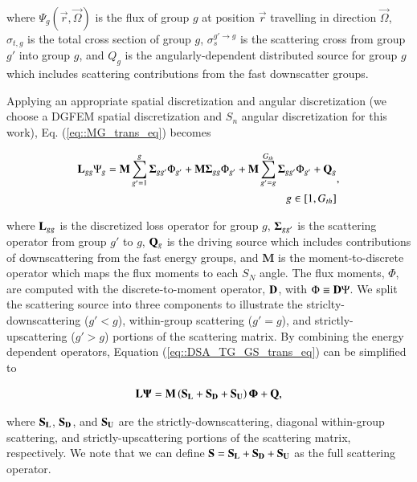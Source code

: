 \documentclass[preprint,10pt]{elsarticle}
\begin{document}
\noindent where $\Psi_g (\vec{r}, \vec{\Omega})$ is the flux of group $g$ at position $\vec{r}$ travelling in direction $\vec{\Omega}$, $\sigma_{t,g}$ is the total cross section of group $g$, $ \sigma_{s}^{g' \rightarrow g}$ is the scattering cross from group $g'$ into group $g$, and $Q_g$ is the angularly-dependent distributed source for group $g$ which includes scattering contributions from the fast downscatter groups.

Applying an appropriate spatial discretization and angular discretization (we choose a DGFEM spatial discretization and $S_n$ angular discretization for this work), Eq. (\ref{eq::MG_trans_eq}) becomes

\begin{equation}
\label{eq::DSA_TG_GS_trans_eq}
\begin{aligned}
{\bf L}_{gg} \Psi_g ={\bf M} \sum_{g'=1}^{g} {\bf \Sigma}_{g g'} \Phi_{g'} + {\bf M} {\bf \Sigma}_{g g} \Phi_{g'} + {\bf M} \sum_{g'=g}^{G_{th}} {\bf \Sigma}_{g g'} \Phi_{g'}+ {\bf Q}_g  \\
g \in [1,G_{th}]
\end{aligned} ,
\end{equation}

\noindent where ${\bf L}_{gg}$ is the discretized loss operator for group $g$, ${\bf \Sigma}_{g g'}$ is the scattering operator from group $g'$ to $g$, ${\bf Q}_g$ is the driving source which includes contributions of downscattering from the fast energy groups, and {\bf M} is the moment-to-discrete operator which maps the flux moments to each $S_N$ angle. The flux moments, $\Phi$, are computed with the discrete-to-moment operator, ${\bf D}$, with $\Phi \equiv {\bf D} \Psi$. We split the scattering source into three components to illustrate the striclty-downscattering ($g' < g$), within-group scattering ($g'=g$), and strictly-upscattering ($g' > g$) portions of the scattering matrix. By combining the energy dependent operators, Equation (\ref{eq::DSA_TG_GS_trans_eq}) can be simplified to

\begin{equation}
\label{eq::DSA_TG_trans_eq_ops}
{\bf L} {\bf \Psi} = {\bf M} \left( {\bf S_L} +  {\bf S_D} + {\bf S_U} \right) {\bf \Phi} + {\bf Q} ,
\end{equation}

\noindent where ${\bf S_L}$, ${\bf S_D}$, and ${\bf S_U}$ are the strictly-downscattering, diagonal within-group scattering, and strictly-upscattering portions of the scattering matrix, respectively. We note that we can define ${\bf S} = {\bf S_L} + {\bf S_D} +{\bf S_U} $ as the full scattering operator. 
\end{document}
